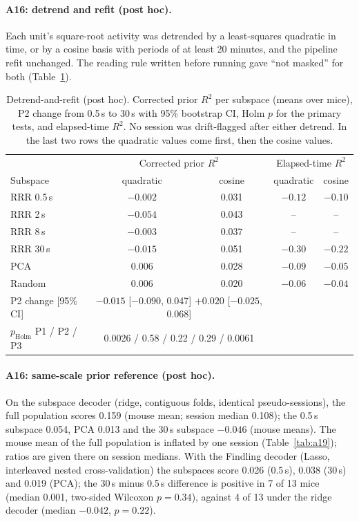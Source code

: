 \documentclass{article}
\newcommand{\holm}{p_{\mathrm{Holm}}}
\begin{document}
\paragraph{A16: detrend and refit (post hoc).} Each unit's square-root activity was detrended by a least-squares
quadratic in time, or by a cosine basis with periods of at least 20 minutes, and the pipeline refit unchanged. The
reading rule written before running gave ``not masked'' for both (Table~\ref{tab:detrend}).

\begin{table}[H]
  \caption{Detrend-and-refit (post hoc). Corrected prior $R^2$ per subspace (means over mice), P2 change from 0.5\,s
  to 30\,s with 95\% bootstrap CI, Holm $p$ for the primary tests, and elapsed-time $R^2$. No session was drift-flagged
  after either detrend. In the last two rows the quadratic values come first, then the cosine values.}
  \label{tab:detrend}
  \centering\small
  \begin{tabular}{lcccc}
    \toprule
     & \multicolumn{2}{c}{Corrected prior $R^2$} & \multicolumn{2}{c}{Elapsed-time $R^2$} \\
    Subspace & quadratic & cosine & quadratic & cosine \\
    \midrule
    RRR 0.5\,s & $-0.002$ & 0.031 & $-0.12$ & $-0.10$ \\
    RRR 2\,s   & $-0.054$ & 0.043 & -- & -- \\
    RRR 8\,s   & $-0.003$ & 0.037 & -- & -- \\
    RRR 30\,s  & $-0.015$ & 0.051 & $-0.30$ & $-0.22$ \\
    PCA        & 0.006 & 0.028 & $-0.09$ & $-0.05$ \\
    Random     & 0.006 & 0.020 & $-0.06$ & $-0.04$ \\
    \midrule
    P2 change [95\% CI] & \multicolumn{2}{c}{$-0.015$ [$-0.090$, 0.047] \quad $+0.020$ [$-0.025$, 0.068]} & & \\
    $\holm$ P1 / P2 / P3 & \multicolumn{2}{c}{0.0026 / 0.58 / 0.22 \quad 0.0007 / 0.29 / 0.0061} & & \\
    \bottomrule
  \end{tabular}
\end{table}

\paragraph{A16: same-scale prior reference (post hoc).} On the subspace decoder (ridge, contiguous folds, identical
pseudo-sessions), the full population scores 0.159 (mouse mean; session median 0.108); the 0.5\,s subspace 0.054,
PCA 0.013 and the 30\,s subspace $-0.046$ (mouse means). The mouse mean of the full population is inflated by one
session (Table~\ref{tab:a19}); ratios are given there on session medians. With the Findling decoder (Lasso, interleaved nested
cross-validation) the subspaces score 0.026 (0.5\,s), 0.038 (30\,s) and 0.019 (PCA); the 30\,s minus 0.5\,s difference
is positive in 7 of 13 mice (median 0.001, two-sided Wilcoxon $p=0.34$), against 4 of 13 under the ridge decoder
(median $-0.042$, $p=0.22$).
\end{document}
